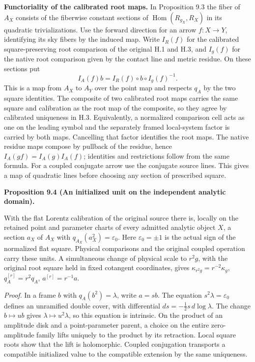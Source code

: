 \documentclass[
  english,
  11pt,
  reqno]{amsart}
\makeatletter
\newcommand{\paperleadspace}{%
  \par\if@nobreak\else
    \addpenalty{\@secpenalty}\addvspace{.5\baselineskip}%
  \fi}
\newcommand{\paperleadin}[1]{%
  \ifvmode\paperleadspace\fi
  \textbf{#1}}
\newcommand{\pandocstatementheading}[1]{%
  \par\if@nobreak\else
    \addpenalty{\@beginparpenalty}%
    \addvspace{.5\baselineskip plus .2\baselineskip minus .2\baselineskip}%
  \fi
  {\normalfont\bfseries #1\par}%
  \nobreak\@afterindenttrue\@afterheading
}
\makeatother
\begin{document}
\paperleadin{Functoriality of the calibrated root maps.} In Proposition 9.3
the fiber of \(A_X\) consists of the fiberwise constant sections of
\(\operatorname{Hom}(R_{g_X},R_X)\) in its quadratic trivializations.
Use the forward direction for an arrow \(f:X\to Y\), identifying its sky
fibers by the induced map. Write \(I_R(f)\) for the calibrated
square-preserving root comparison of the original H.1 and H.3, and
\(I_g(f)\) for the native root comparison given by the contact line and
metric residue. On these sections put \[
I_A(f)b=I_R(f)\circ b\circ I_g(f)^{-1}.
\] This is a map from \(A_X\) to \(A_Y\) over the point map and respects
\(q_A\) by the two square identities. The composite of two calibrated
root maps carries the same square and calibration as the root map of the
composite, so they agree by calibrated uniqueness in H.3. Equivalently,
a normalized comparison cell acts as one on the leading symbol and the
separately framed local-system factor is carried by both maps.
Cancelling that factor identifies the root maps. The native residue maps
compose by pullback of the residue, hence \(I_A(gf)=I_A(g)I_A(f)\);
identities and restrictions follow from the same formula. For a coupled
conjugate arrow use the conjugate source lines. This gives a map of
quadratic lines before choosing any section of prescribed square.

\pandocstatementheading{\leavevmode{}\label{prop:initialized-analytic-unit}Proposition 9.4 (An initialized unit on the independent analytic
domain).}

With the flat Lorentz calibration of the original source there is,
locally on the retained point and parameter charts of every admitted
analytic object \(X\), a section \(a_X\) of \(A_X\) with
\(q_{A_X}(a_X^2)=\varepsilon_0\). Here \(\varepsilon_0=\pm1\) is the
actual sign of the normalized flat square. Physical comparisons and the
original coupled operation carry these units. A simultaneous change of
physical scale to \(r^2g\), with the original root square held in fixed
cotangent coordinates, gives \(\kappa_{r^2g}=r^{-2}\kappa_g\),
\(q_A^{[r]}=r^2q_A\), \(a^{[r]}=r^{-1}a\).

\emph{Proof.} In a frame \(b\) with \(q_A(b^2)=\lambda\), write
\(a=sb\). The equation \(s^2\lambda=\varepsilon_0\) defines an
unramified double cover, with differential
\(ds=-\tfrac12s\,d\log\lambda\). The change \(b\mapsto ub\) gives
\(\lambda\mapsto u^2\lambda\), so this equation is intrinsic. On the
product of an amplitude disk and a point-parameter parent, a choice on
the entire zero-amplitude family lifts uniquely to the product by its
retraction. Local square roots show that the lift is holomorphic.
Coupled conjugation transports a compatible initialized value to the
compatible extension by the same uniqueness.
\end{document}
